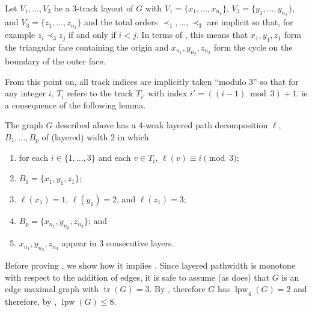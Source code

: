 \documentclass{patmorin}
\DeclareMathOperator{\tr}{tr}
\DeclareMathOperator{\lpw}{lpw}
\begin{document}
Let $V_1,\ldots,V_3$ be a 3-track layout of $G$ with
$V_1=\{x_1,\ldots,x_{n_1}\}$, $V_2=\{y_1,\ldots,y_{n_2}\}$, and
$V_3=\{z_1,\ldots,z_{n_3}\}$ and the total orders $\prec_1,\ldots,\prec_3$
are implicit so that, for example $z_i\prec_3 z_j$ if and only if $i<j$.
In terms of , this means that $x_1,y_1,z_1$ form
the triangular face containing the origin and $x_{n_1},y_{n_2},z_{n_3}$
form the cycle on the boundary of the outer face.

From this point on, all track indices are implicitly taken ``modulo 3''
so that for any integer $i$, $T_i$ refers to the track $T_{i'}$ with
index $i'=((i-1)\bmod 3)+1$.   is a consequence of the
following lemma.

\begin{lem}
  The graph $G$ described above has a 4-weak layered path decomposition
  $\ell$, $B_1,\ldots,B_p$ of (layered) width $2$ in which 
  \begin{enumerate}
    \item for each $i\in\{1,\ldots,3\}$ and each $v\in T_i$,
      $\ell(v)\equiv i\pmod 3$;
    \item $B_1=\{x_1,y_1,z_1\}$;
    \item $\ell(x_1)=1$, $\ell(y_1)=2$, and $\ell(z_1)=3$;
    \item $B_p=\{x_{n_1},y_{n_2},z_{n_3}\}$; and
    \item $x_{n_1},y_{n_2},z_{n_3}$ appear in 3 consecutive layers.
  \end{enumerate}
\end{lem}

Before proving , we show how it implies .
Since layered pathwidth is monotone with respect to the addition
of edges, it is safe to assume (as  does) that $G$ is an
edge maximal graph with $\tr(G)=3$.  By , therefore $G$
has $\lpw_4(G)=2$ and therefore, by , $\lpw(G)\le 8$.
\end{document}

